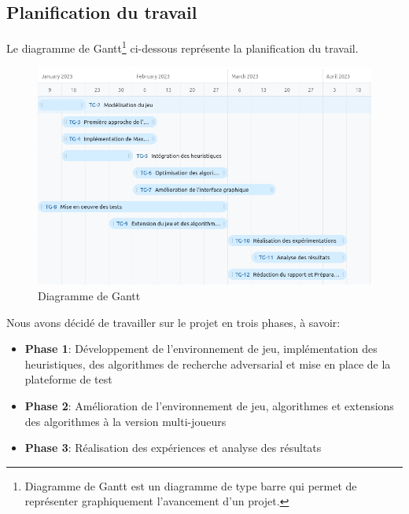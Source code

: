\subsection{Planification du travail}
Le diagramme de Gantt\footnote{Diagramme de Gantt est un diagramme de type barre qui permet de représenter graphiquement l'avancement d'un projet.} ci-dessous représente la planification du travail.
\begin{figure}[!ht]
	\centering
	\includegraphics[scale=0.5]{Images/gant.png}
	\caption{Diagramme de Gantt}
	\label{fig:gantt}
\end{figure}
Nous avons décidé de travailler sur le projet en trois phases, à savoir:
\begin{itemize}
	\item \textbf{Phase 1}: Développement de l'environnement de jeu, implémentation des heuristiques, des algorithmes de recherche adversarial et mise en place de la plateforme de test
	\item \textbf{Phase 2}: Amélioration de l'environnement de jeu, algorithmes et extensions des algorithmes à la version multi-joueurs
	\item \textbf{Phase 3}: Réalisation des expériences et analyse des résultats
\end{itemize}
